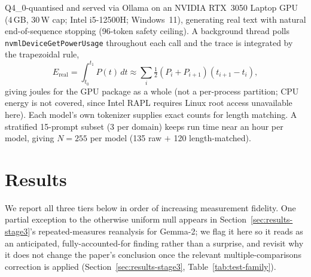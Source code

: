 \documentclass[conference]{IEEEtran}
\begin{document}
Q4\_0-quantised and served via Ollama on an NVIDIA RTX~3050 Laptop GPU
(4\,GB, 30\,W cap; Intel i5-12500H; Windows~11), generating real text
with natural end-of-sequence stopping (96-token safety ceiling). A
background thread polls \texttt{nvmlDeviceGetPowerUsage} throughout
each call and the trace is integrated by the trapezoidal rule,
\begin{equation}
  E_\text{real} = \int_{t_0}^{t_1} P(t)\,dt \approx
  \sum_i \tfrac{1}{2}(P_i+P_{i+1})(t_{i+1}-t_i),
  \label{eq:nvml}
\end{equation}
giving joules for the GPU package as a whole (not a per-process
partition; CPU energy is not covered, since Intel RAPL requires
Linux root access unavailable here). Each model's own tokenizer
supplies exact counts for length matching. A stratified 15-prompt
subset (3 per domain) keeps run time near an hour per model, giving
$N=255$ per model (135 raw $+$ 120 length-matched).
\section{Results}
\label{sec:results}
We report all three tiers below in order of increasing measurement fidelity.
One partial exception to the otherwise uniform null appears in
Section~\ref{sec:results-stage3}'s repeated-measures reanalysis for
Gemma-2; we flag it here so it reads as an anticipated, fully-accounted-for
finding rather than a surprise, and revisit why it does not change the
paper's conclusion once the relevant multiple-comparisons correction is
applied (Section~\ref{sec:results-stage3}, Table~\ref{tab:test-family}).
\end{document}
